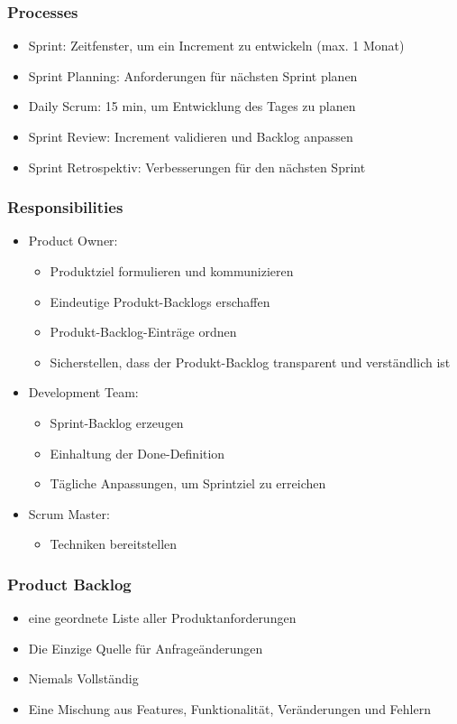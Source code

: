 \subsubsection{Processes}
\begin{itemize}
	\item Sprint: Zeitfenster, um ein Increment zu entwickeln (max. 1 Monat)
	\item Sprint Planning: Anforderungen für nächsten Sprint planen
	\item Daily Scrum: 15 min, um Entwicklung des Tages zu planen
	\item Sprint Review: Increment validieren und Backlog anpassen
	\item Sprint Retrospektiv: Verbesserungen für den nächsten Sprint
\end{itemize}
\subsubsection{Responsibilities}
\begin{itemize}
	\item Product Owner:
		\begin{itemize}
			\item Produktziel formulieren und kommunizieren
			\item Eindeutige Produkt-Backlogs erschaffen
			\item Produkt-Backlog-Einträge ordnen
			\item Sicherstellen, dass der Produkt-Backlog transparent und verständlich ist
		\end{itemize}
	\item Development Team:
		\begin{itemize}
			\item Sprint-Backlog erzeugen
			\item Einhaltung der \glqq{}Done\grqq{}-Definition
			\item Tägliche Anpassungen, um Sprintziel zu erreichen
		\end{itemize}
	\item Scrum Master:
		\begin{itemize}
			\item Techniken bereitstellen
		\end{itemize}
\end{itemize} 
\subsubsection{Product Backlog}
\begin{itemize}
	\item eine geordnete Liste aller Produktanforderungen
	\item Die Einzige Quelle für Anfrageänderungen
	\item Niemals Vollständig
	\item Eine Mischung aus Features, Funktionalität, Veränderungen und Fehlern
\end{itemize}
